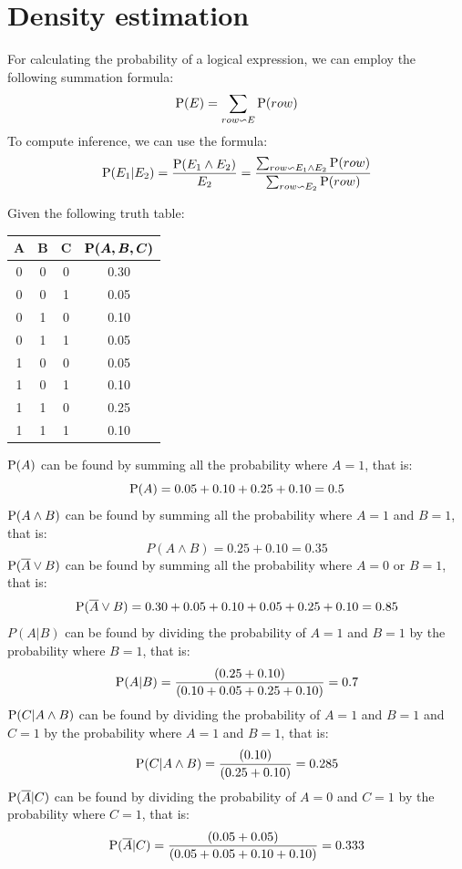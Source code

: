 \section{Density estimation}

For calculating the probability of a logical expression, we can employ the following summation formula:
\[\textnormal{P}(E)=\sum_{row \backsim E}\textnormal{P}(row)\]
To compute inference, we can use the formula:
\[\textnormal{P}(E_1|E_2)=\dfrac{\textnormal{P}(E_1 \land E_2)}{E_2}=\dfrac{\sum_{row \backsim E_1 \land E_2}\textnormal{P}(row)}{\sum_{row \backsim E_2}\textnormal{P}(row)}\]
\begin{example}
    Given the following truth table: 
    \begin{table}[H]
        \centering
        \begin{tabular}{ccc|c}
        \hline
        $\boldsymbol{A}$ & $\boldsymbol{B}$ & $\boldsymbol{C}$ & $\boldsymbol{\textnormal{\textbf{P}}(A,B,C)}$ \\ \hline
        0   & 0   & 0   & 0.30       \\ 
        0   & 0   & 1   & 0.05       \\ 
        0   & 1   & 0   & 0.10       \\ 
        0   & 1   & 1   & 0.05       \\ 
        1   & 0   & 0   & 0.05       \\ 
        1   & 0   & 1   & 0.10       \\ 
        1   & 1   & 0   & 0.25       \\ 
        1   & 1   & 1   & 0.10       \\ \hline
        \end{tabular}
    \end{table}
    $\textnormal{P}(A)$ can be found by summing all the probability where $A=1$, that is: 
    \[\textnormal{P}(A) = 0.05 + 0.10 + 0.25 + 0.10 = 0.5\]
    $\textnormal{P}(A \land B)$ can be found by summing all the probability where $A=1$ and $B=1$, that is: 
    \[P(A \land B) = 0.25 + 0.10 = 0.35\]
    $\textnormal{P}(\overline{A} \lor B)$ can be found by summing all the probability where $A=0$ or $B=1$, that is: 
    \[\textnormal{P}(\overline{A} \lor B) = 0.30 + 0.05 + 0.10 + 0.05 + 0.25 + 0.10 = 0.85\]
    $P(A | B)$ can be found by dividing the probability of $A=1$ and $B=1$ by the probability where $B=1$, that is: 
    \[\textnormal{P}(A | B) = \dfrac{(0.25+0.10)}{(0.10+0.05+0.25+0.10)}=0.7\]
    $\textnormal{P}(C | A \land B)$ can be found by dividing the probability of $A=1$ and $B=1$ and $C=1$ by the probability where $A=1$ and $B=1$, that is: 
    \[\textnormal{P}(C | A \land B) = \dfrac{(0.10)}{(0.25+0.10)}=0.285\]
    $\textnormal{P}(\overline{A} | C)$ can be found by dividing the probability of $A=0$ and $C=1$ by the probability where $C=1$, that is: 
    \[\textnormal{P}(\overline{A} | C) = \dfrac{(0.05+0.05)}{(0.05+0.05+0.10+0.10)}=0.333\]
\end{example}
